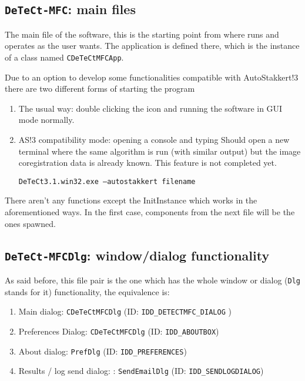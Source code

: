\documentclass[a4paper,11pt]{memoir}
\begin{document}
\subsection{\texttt{DeTeCt-MFC}: main files}

The main file of the software, this is the starting point from where runs and operates as the user wants. The application is defined there, which is the instance of a class named \texttt{CDeTeCtMFCApp}.

Due to an option to develop some functionalities compatible with AutoStakkert!3 there are two different forms of starting the program
\begin{enumerate}
\item The usual way: double clicking the icon and running the software in GUI mode
normally.
\item AS!3 compatibility mode: opening a console and typing Should open a new terminal
where the same algorithm is run (with similar output) but the image coregistration
data is already known. This feature is not completed yet.
\begin{center} \texttt{DeTeCt3.1.win32.exe –autostakkert filename}
\end{center}
\end{enumerate}

There aren’t any functions except the InitInstance which works in the aforementioned ways. In the first case, components from the next file will be the ones spawned.


\subsection{\texttt{DeTeCt-MFCDlg}: window/dialog functionality}

As said before, this file pair is the one which has the whole window or dialog (\texttt{Dlg} stands for it) functionality, the equivalence is:

\begin{enumerate}
\item Main dialog: \texttt{CDeTeCtMFCDlg} (ID: \texttt{IDD\_DETECTMFC\_DIALOG} )
\item Preferences Dialog: \texttt{CDeTeCtMFCDlg} (ID: \texttt{IDD\_ABOUTBOX})
\item About dialog: \texttt{PrefDlg} (ID: \texttt{IDD\_PREFERENCES})
\item Results / log send dialog: : \texttt{SendEmailDlg} (ID: \texttt{IDD\_SENDLOGDIALOG})
\end{enumerate}
\end{document}
